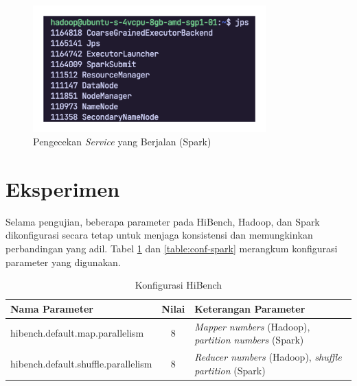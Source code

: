 \begin{enumerate}
\begin{figure}[h]
		    \includegraphics[width=0.8\textwidth]{figures/ch04/service-spark}
		    \caption{Pengecekan \textit{Service} yang Berjalan (Spark)}
		    \label{fig:service-spark}
		\end{figure}
\end{enumerate}

\newpage
\section{Eksperimen}
Selama pengujian, beberapa parameter pada HiBench, Hadoop, dan Spark dikonfigurasi secara tetap untuk menjaga konsistensi dan memungkinkan perbandingan yang adil. Tabel \ref{table:conf-hibench} dan \ref{table:conf-spark} merangkum konfigurasi parameter yang digunakan.

\begin{table}[h]
\caption{Konfigurasi HiBench}
\label{table:conf-hibench}
\scriptsize
\centering
\begin{tabular}{l c p{5cm}} 
\hline
\textbf{Nama Parameter} & \textbf{Nilai} & \textbf{Keterangan Parameter} \\ \hline
hibench.default.map.parallelism     & 8 & \textit{Mapper numbers} (Hadoop), \textit{partition numbers} (Spark)                          \\
hibench.default.shuffle.parallelism & 8 & \textit{Reducer numbers}  (Hadoop), \textit{shuffle partition} (Spark)\\ \hline                        
\end{tabular}
\end{table}

